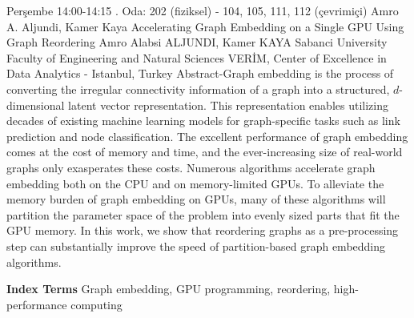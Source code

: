 
    \begin{abstract_basarim}
    {Perşembe 14:00-14:15}
    {.}
    {Oda: 202 (fiziksel) - 104, 105, 111, 112 (çevrimiçi)}
    {Amro A. Aljundi, Kamer Kaya}
    {Accelerating Graph Embedding on a Single GPU Using Graph Reordering}
    {%
    Amro Alabsi ALJUNDI, Kamer KAYA}
    {%
    }
    {%
    Sabanci University Faculty of Engineering and Natural Sciences \newline \noindent VERİM, Center of Excellence in Data Analytics - Istanbul, Turkey}
    Abstract-Graph embedding is the process of converting the irregular connectivity information of a graph into a structured, $d$-dimensional latent vector representation. This representation enables utilizing decades of existing machine learning models for graph-specific tasks such as link prediction and node classification. The excellent performance of graph embedding comes at the cost of memory and time, and the ever-increasing size of real-world graphs only exasperates these costs. Numerous algorithms accelerate graph embedding both on the CPU and on memory-limited GPUs. To alleviate the memory burden of graph embedding on GPUs, many of these algorithms will partition the parameter space of the problem into evenly sized parts that fit the GPU memory. In this work, we show that reordering graphs as a pre-processing step can substantially improve the speed of partition-based graph embedding algorithms. 
    
            \textbf{Index Terms} \newline{}Graph embedding, GPU programming, reordering, high-performance computing
    \end{abstract_basarim}
    